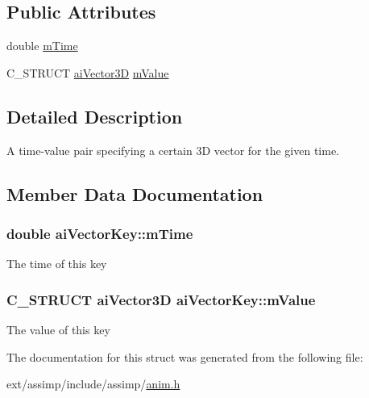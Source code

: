 \subsection*{Public Attributes}
\begin{DoxyCompactItemize}
\item 
double \hyperlink{structai_vector_key_ab3c43c166434c7a505083d1929f675bc}{m\-Time}
\item 
C\-\_\-\-S\-T\-R\-U\-C\-T \hyperlink{structai_vector3_d}{ai\-Vector3\-D} \hyperlink{structai_vector_key_a6f73649028b136a193dac21de35188ad}{m\-Value}
\end{DoxyCompactItemize}


\subsection{Detailed Description}
A time-\/value pair specifying a certain 3\-D vector for the given time. 

\subsection{Member Data Documentation}
\hypertarget{structai_vector_key_ab3c43c166434c7a505083d1929f675bc}{
\subsubsection[{m\-Time}]{\setlength{\rightskip}{0pt plus 5cm}double ai\-Vector\-Key\-::m\-Time}}\label{structai_vector_key_ab3c43c166434c7a505083d1929f675bc}
The time of this key \hypertarget{structai_vector_key_a6f73649028b136a193dac21de35188ad}{
\subsubsection[{m\-Value}]{\setlength{\rightskip}{0pt plus 5cm}C\-\_\-\-S\-T\-R\-U\-C\-T {\bf ai\-Vector3\-D} ai\-Vector\-Key\-::m\-Value}}\label{structai_vector_key_a6f73649028b136a193dac21de35188ad}
The value of this key 

The documentation for this struct was generated from the following file\-:\begin{DoxyCompactItemize}
\item 
ext/assimp/include/assimp/\hyperlink{anim_8h}{anim.\-h}\end{DoxyCompactItemize}
